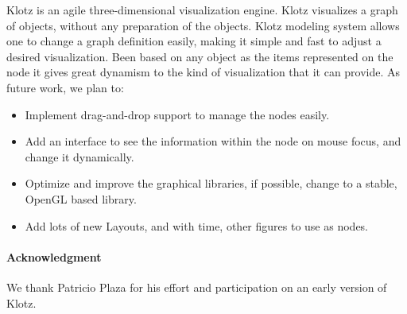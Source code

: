 \documentclass{sig-alternate}
\begin{document}
Klotz is an agile three-dimensional visualization engine. Klotz visualizes a graph of objects, without any preparation of the objects.
Klotz modeling system allows one to change a graph definition easily, making it simple and fast to adjust a desired visualization. Been based on any object as the items represented on the node it gives great dynamism to the kind of visualization that it can provide. 
As future work, we plan to:
\begin{itemize}
\item Implement drag-and-drop support to manage the nodes easily.
\item Add an interface to see the information within the node on mouse focus, and change it dynamically.
\item Optimize and improve the graphical libraries, if possible, change to a stable, OpenGL based library.
\item Add lots of new Layouts, and with time, other figures to use as nodes. 
\end{itemize}

\paragraph{Acknowledgment} 
We thank Patricio Plaza for his effort and participation on an early version of Klotz.

%



\end{document}
